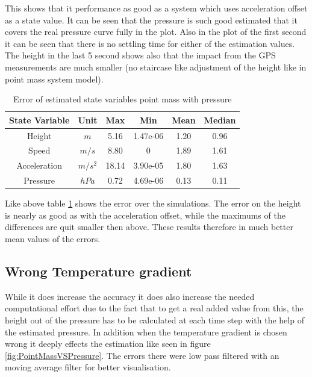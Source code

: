 This shows that it performance as good as a system which uses acceleration offset as a state value.
It can be seen that the pressure is such good estimated that it covers the real pressure curve fully in the plot.
Also in the plot of the first second it can be seen that there is no settling time for either of the estimation values.
The height in the last 5 second shows also that the impact from the GPS measurements are much smaller (no staircase like adjustment of the height like in point mass system model).

\begin{table}[h!]
\centering
\begin{tabular}{cccccc}
\hline
\multicolumn{1}{|c|}{State Variable} & \multicolumn{1}{c|}{Unit} & \multicolumn{1}{c|}{Max} & \multicolumn{1}{c|}{Min} & \multicolumn{1}{c|}{Mean} & \multicolumn{1}{c|}{Median} \\ \hline
Height                            & $m$                         & 5.16                   & 1.47e-06                 & 1.20                    & 0.96                      \\
Speed                             & $m/s$                       & 8.80                   & 0                        & 1.89                    & 1.61                      \\
Acceleration                      & $m/s^2$   			& 18.14                  & 3.90e-05                 & 1.80                    & 1.63                      \\
Pressure                  	  & $hPa$   			& 0.72                   & 4.69e-06                 & 0.13                    & 0.11                     
\end{tabular}
\caption{Error of estimated state variables point mass with pressure}
\label{tab:ErrorPointMassPressure}
\end{table}

Like above table \ref{tab:ErrorPointMassPressure} shows the error over the simulations.
The error on the height is nearly as good as with the acceleration offset, while the maximums of the differences are quit smaller then above.
These results therefore in much better mean values of the errors.

\subsection{Wrong Temperature gradient}
While it does increase the accuracy it does also increase the needed computational effort due to the fact that to get a real added value from this,
the height out of the pressure has to be calculated at each time step with the help of the estimated pressure.
In addition when the temperature gradient is chosen wrong it deeply effects the estimation like seen in figure \ref{fig:PointMassVSPressure}.
The errors there were low pass filtered with an moving average filter for better visualisation.

